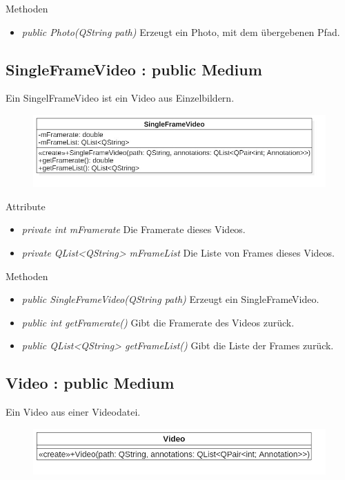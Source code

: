 Methoden
\begin{itemize}
\item \textit{public Photo(QString path)} Erzeugt ein Photo, mit dem übergebenen Pfad.
\end{itemize}

\subsection*{SingleFrameVideo : public Medium}
Ein SingelFrameVideo ist ein Video aus Einzelbildern.

\begin{figure}[H]
\centering
\includegraphics[scale=0.5]{img/Klassendiagramm/Klassen/Model/SingleFrameVideo}
\label{fig:singleFrameVideo}
\end{figure}

Attribute
\begin{itemize}
\item\textit{private int mFramerate} Die Framerate dieses Videos.
\item\textit{private QList<QString> mFrameList} Die Liste von Frames dieses Videos.
\end{itemize}

Methoden
\begin{itemize}
\item \textit{public SingleFrameVideo(QString path)} Erzeugt ein SingleFrameVideo.
\item \textit{public int getFramerate()} Gibt die Framerate des Videos zurück.
\item \textit{public QList<QString> getFrameList()} Gibt die Liste der Frames zurück.
\end{itemize}

\subsection*{Video : public Medium}
Ein Video aus einer Videodatei.

\begin{figure}[H]
\centering
\includegraphics[scale=0.5]{img/Klassendiagramm/Klassen/Model/Video}
\label{fig:video}
\end{figure}

